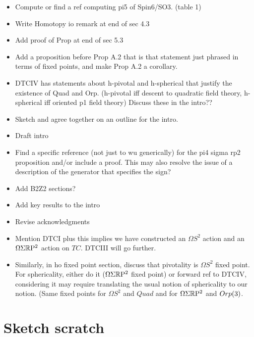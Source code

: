 \documentclass{amsart}
\begin{document}
\begin{itemize}
\item Compute or find a ref computing pi5 of Spin6/SO3. (table 1)
\item Write Homotopy io remark at end of sec 4.3
\item Add proof of Prop at end of sec 5.3
\item Add a proposition before Prop A.2 that is that statement just phrased in terms of fixed points, and make Prop A.2 a corollary.
\item DTCIV has statements about h-pivotal and h-spherical that justify the existence of Quad and Orp. (h-pivotal iff descent to quadratic field theory, h-spherical iff oriented p1 field theory) Discuss these in the intro??
\item Sketch and agree together on an outline for the intro.
\item Draft intro
\item Find a specific reference (not just to wu generically) for the pi4 sigma rp2 proposition and/or include a proof. This may also resolve the issue of a description of the generator that specifies the sign?
\end{itemize}

\begin{itemize}
\item Add B2Z2 sections?
\item Add key results to the intro
\item Revise acknowledgments
\end{itemize}

\begin{itemize}
\item Mention DTCI plus this implies we have constructed an $\Omega S^2$ action and an $\Omega \Sigma \mathbb R \mathrm{P}^2$ action on $TC$.  DTCIII will go further.
\item Similarly, in ho fixed point section, discuss that pivotality is $\Omega S^2$ fixed point.  For sphericality, either do it ($\Omega \Sigma \mathbb R \mathrm{P}^2$ fixed point) or forward ref to DTCIV, considering it may require translating the usual notion of sphericality to our notion.  (Same fixed points for $\Omega S^2$ and $Quad$ and for $\Omega \Sigma \mathbb R \mathrm{P}^2$ and $Orp(3)$.
\end{itemize}


\section*{Sketch scratch}
\end{document}
